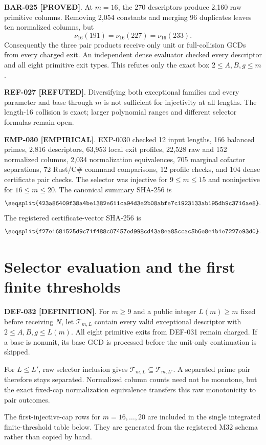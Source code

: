 \documentclass[11pt]{article}
\newcommand{\claimstatus}[2]{\textbf{#1 [#2]}}
\begin{document}
\claimstatus{BAR-025}{PROVED}. At \(m=16\), the 270 descriptors produce
2,160 raw primitive columns. Removing 2,054 constants and merging 96
duplicates leaves ten normalized columns, but
\[
\nu_{16}(191)=\nu_{16}(227)=\nu_{16}(233).
\]
Consequently the three pair products receive only unit or full-collision
GCDs from every charged exit. An independent dense evaluator checked every
descriptor and all eight primitive exit types. This refutes only the exact
box \(2\le A,B,g\le m\).

\claimstatus{REF-027}{REFUTED}. Diversifying both exceptional families and
every parameter and base through \(m\) is not sufficient for injectivity at
all lengths. The length-16 collision is exact; larger polynomial ranges and
different selector formulas remain open.

\claimstatus{EMP-030}{EMPIRICAL}. EXP-0030 checked 12 input lengths, 166
balanced primes, 2,816 descriptors, 63,953 local exit profiles, 22,528 raw
and 152 normalized columns, 2,034 normalization equivalences, 705 marginal
cofactor separations, 72 Rust/C\# command comparisons, 12 profile checks, and
104 dense certificate pair checks. The selector was injective for
\(9\le m\le15\) and noninjective for \(16\le m\le20\). The canonical summary
SHA-256 is
\[
\texttt{\seqsplit{423a86409f38a4be1382e611ca94d3e2b08abfe7c1923133ab195db9c3716ae8}}.
\]
The registered certificate-vector SHA-256 is
\[
\texttt{\seqsplit{f27e1681525d9c71f488c07457ed998cd43a8ea85ccac5b6e8e1b1e7227e93d0}}.
\]

\section{Selector evaluation and the first finite thresholds}

\claimstatus{DEF-032}{DEFINITION}. For \(m\ge9\) and a public integer
\(L(m)\ge m\) fixed before receiving \(N\), let
\(\mathcal T_{m,L}\) contain every valid exceptional descriptor with
\(2\le A,B,g\le L(m)\). All eight primitive exits from DEF-031 remain
charged. If a base is nonunit, its base GCD is processed before the
unit-only continuation is skipped.

For \(L\le L'\), raw selector inclusion gives
\(\mathcal T_{m,L}\subseteq\mathcal T_{m,L'}\). A separated prime pair
therefore stays separated. Normalized column counts need not be monotone,
but the exact fixed-cap normalization equivalence transfers this raw
monotonicity to pair outcomes.

The first-injective-cap rows for \(m=16,\ldots,20\) are included in the
single integrated finite-threshold table below. They are generated from the
registered M32 schema rather than copied by hand.
\end{document}
